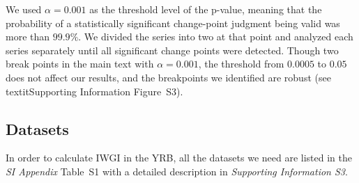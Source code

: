 		We used $\alpha = 0.001$ as the threshold level of the p-value, meaning that the probability of a statistically significant change-point judgment being valid was more than $99.9\%$. We divided the series into two at that point and analyzed each series separately until all significant change points were detected. Though two break points in the main text with $\alpha = 0.001$, the threshold from $0.0005$ to $0.05$ does not affect our results, and the breakpoints we identified are robust (see \\textit{Supporting Information} Figure~S3).

	\subsection{Datasets}
	In order to calculate IWGI in the YRB, all the datasets we need are listed in the \textit{SI Appendix} Table~S1 with a detailed description in \textit{Supporting Information S3}.
